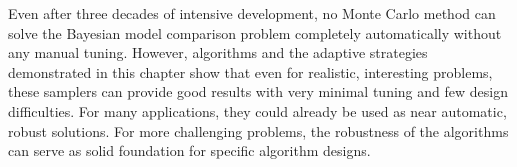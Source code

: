 Even after three decades of intensive development, no Monte Carlo method can
solve the Bayesian model comparison problem completely automatically without
any manual tuning. However, \smc algorithms and the adaptive strategies
demonstrated in this chapter show that even for realistic, interesting problems,
these samplers can provide good results with very minimal tuning and few
design difficulties. For many applications, they could already be used as near
automatic, robust solutions. For more challenging problems, the robustness of
the algorithms can serve as solid foundation for specific algorithm designs.
